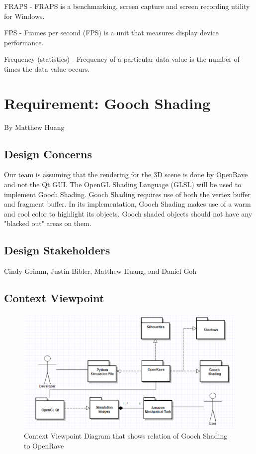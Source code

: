 \documentclass[10pt,journal,compsoc,draftclsnofoot]{IEEEtran}
\begin{document}
\begin{flushleft}
FRAPS - FRAPS is a benchmarking, screen capture and screen recording utility for Windows.

FPS - Frames per second (FPS) is a unit that measures display device performance.

Frequency (statistics) - Frequency of a particular data value is the number of times the data value occurs. \cite{freq}

\newpage

\section{Requirement: Gooch Shading}
\large{By Matthew Huang}

\normalsize
\subsection{Design Concerns}
Our team is assuming that the rendering for the 3D scene is done by OpenRave and not the Qt GUI.
The OpenGL Shading Language (GLSL) will be used to implement Gooch Shading. 
Gooch Shading requires use of both the vertex buffer and fragment buffer.
In its implementation, Gooch Shading makes use of a warm and cool color to highlight its objects.
Gooch shaded objects should not have any "blacked out" areas on them.

\subsection{Design Stakeholders}
Cindy Grimm, Justin Bibler, Matthew Huang, and Daniel Goh

\subsection{Context Viewpoint}

\begin{figure} [H]
  \includegraphics[scale=0.8]{Gooch_Shading_context.eps}
  \caption
{ \newline \hspace{\linewidth}
Context Viewpoint Diagram that shows relation of Gooch Shading to OpenRave}
  \label{fig:Gooch_Shading_context}
\end{figure}


\end{flushleft}
\end{document}

